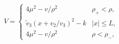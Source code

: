 \begin{equation} V=\left\{\begin{array}{ll} 4\mu^2-v/\rho^2 &\mbox{$\rho_{+}<\rho,$}\\
\tilde{v}_3(x+v_2/v_3)^2-k &\mbox{$|x|\leq L,$}\\
4\mu^2-v/\rho^2
&\mbox{$\rho<\rho_{-},$}\end{array}\right.\end{equation} 
